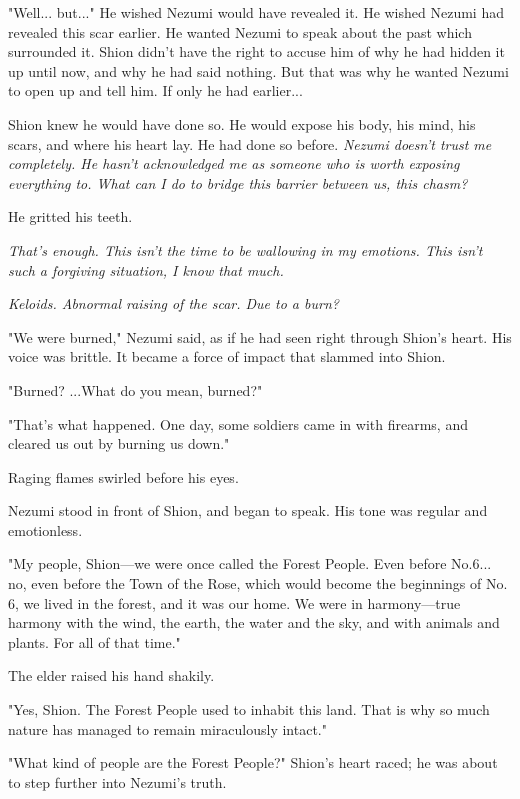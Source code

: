"Well... but..." He wished Nezumi would have revealed it. He wished
Nezumi had revealed this scar earlier. He wanted Nezumi to speak about
the past which surrounded it. Shion didn't have the right to accuse him
of why he had hidden it up until now, and why he had said nothing. But
that was why he wanted Nezumi to open up and tell him. If only he had
earlier...

Shion knew he would have done so. He would expose his body, his mind,
his scars, and where his heart lay. He had done so before. \emph{Nezumi
doesn't trust me completely. He hasn't acknowledged me as someone who is
worth exposing everything to. What can I do to bridge this barrier
between us, this chasm?}

He gritted his teeth.

\emph{That's enough. This isn't the time to be wallowing in my emotions. This
isn't such a forgiving situation, I know that much.}

\emph{Keloids. Abnormal raising of the scar. Due to a burn?}

"We were burned," Nezumi said, as if he had seen right through Shion's
heart. His voice was brittle. It became a force of impact that slammed
into Shion.

"Burned? ...What do you mean, burned?"

"That's what happened. One day, some soldiers came in with firearms, and
cleared us out by burning us down."

Raging flames swirled before his eyes.


Nezumi stood in front of Shion, and began to speak. His tone was regular
and emotionless.

"My people, Shion---we were once called the Forest People. Even before
No.6... no, even before the Town of the Rose, which would become the
beginnings of No. 6, we lived in the forest, and it was our home. We
were in harmony---true harmony with the wind, the earth, the water and the
sky, and with animals and plants. For all of that time."

The elder raised his hand shakily.

"Yes, Shion. The Forest People used to inhabit this land. That is why so
much nature has managed to remain miraculously intact."

"What kind of people are the Forest People?" Shion's heart raced; he was
about to step further into Nezumi's truth.

